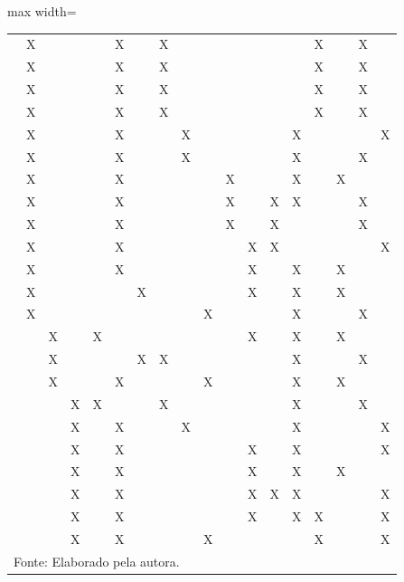 \begin{landscape}
\begin{table}[p]
\begin{adjustbox}{max width=\linewidth}
\begin{tabular}{
l|
c c c|
c c c|
c c c c c|
c c c|
c c c
}
\citet{rolf2020balancing}      & X&&& & X&&X &&&&&& &X&&X& \\
\citet{delaney2024oxonfair}    & X&&& & X&&X &&&&&& &X&&X& \\
\citet{jang2022group}          & X&&& & X&&X &&&&&& &X&&X& \\
\citet{hsu2022pushing}         & X&&& & X&&X &&&&&& &X&&X& \\
\citet{shui2022learning}       & X&&& & X&&& X&&&&& X&&&&X \\
\citet{yazdani2024fair}        & X&&& & X&&& X&&&&& X&&&X& \\
\citet{abernethy2020active}    & X&&& & X&&& &&X&&& X&&X&& \\
\citet{wang2022understanding}  & X&&& & X&&& &&X&&  X&X&&&X&\\
\citet{pang2024fairness}       & X&&& & X&&& &&X&&X &&&&X& \\
\citet{almuzaini2022abcinml}   & X&&& & X&&& &&&X&X &&&&&X \\
\citet{jeong2022fairness}      & X&&& & X&&& &&&X&& X&&X&& \\
\citet{dinh2024learning}       & X&&& & &X&& &&&X&& X&&X&& \\
\citet{zhou2023fair}           & X&&& & &&&& X&&&&X &&&X& \\
\citet{cho2020fair}            & &X&& X &&&& &&&X&& X&&X&& \\
\citet{geden2021fair}          & &X&& & &X&X &&&&&& X&&&X& \\
\citet{buyl2022optimal}        & &X&& & X&&& &X&&&& X&&X&& \\
\citet{martinez2020minimax}    & &&X& X &&&X &&&&&& X&&&X& \\
\citet{lahoti2020fairness}     & &&X& & X&&& X&&&&& X&&&&X \\
\citet{deng2024multi}          & &&X& & X&&& &&&X&& X&&&&X \\
\citet{wang2021fair}           & &&X& & X&&& &&&X&& X&&X&& \\
\citet{wang2022towards}        & &&X& & X&&& &&&X&X &X&&&&X \\
\citet{gardner2023cross}       & &&X& & X&&& &&&X&& X&X&&&X \\
\citet{hu2024sequentially}     & &&X& & X&&& &X&&&& &X&&&X \\

\hline %

\multicolumn{18}{l}{\small Fonte: Elaborado pela autora.} \\ %

\end{tabular}
\end{adjustbox}

\label{tab:fairness_comparison}

\end{table}

\end{landscape}

